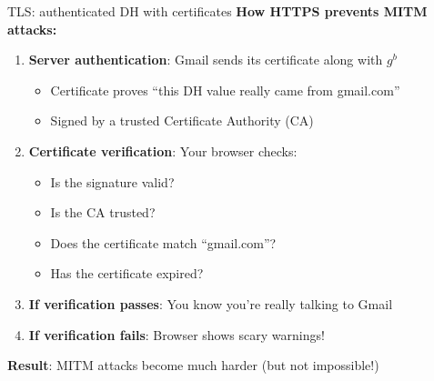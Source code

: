\documentclass[aspectratio=169, lualatex, handout]{beamer}
\begin{document}
\begin{frame}{TLS: authenticated DH with certificates}
	\textbf{How HTTPS prevents MITM attacks:}
	\begin{enumerate}[<+->]
		\item \textbf{Server authentication}: Gmail sends its certificate along with $g^b$
		      \begin{itemize}
			      \item Certificate proves ``this DH value really came from gmail.com''
			      \item Signed by a trusted Certificate Authority (CA)
		      \end{itemize}
		\item \textbf{Certificate verification}: Your browser checks:
		      \begin{itemize}
			      \item Is the signature valid?
			      \item Is the CA trusted?
			      \item Does the certificate match ``gmail.com''?
			      \item Has the certificate expired?
		      \end{itemize}
		\item \textbf{If verification passes}: You know you're really talking to Gmail
		\item \textbf{If verification fails}: Browser shows scary warnings!
	\end{enumerate}
	\textbf{Result}: MITM attacks become much harder (but not impossible!)
\end{frame}
\end{document}
